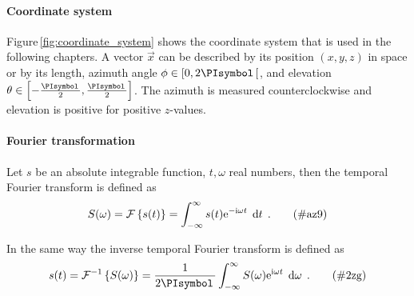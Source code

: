 \paragraph{Coordinate system}
Figure\,\ref{fig:coordinate_system} shows the coordinate system that is used in
the following chapters. A vector $\vec{x}$ can be described by its position
$(x,y,z)$ in space or by its length, azimuth angle $\phi \in [0,2\PI[$,
and elevation $\theta \in \left[-\frac{\PI}{2},\frac{\PI}{2}\right]$.
The azimuth is measured counterclockwise and elevation is positive
for positive $z$-values.


\paragraph{Fourier transformation}
Let $s$ be an absolute integrable function, $t,\omega$ real numbers, then the
temporal Fourier transform is defined as\autocite{Bracewell2000}
%
\begin{equation}
    S(\omega) = \FT{s(t)} = \int^{\infty}_{-\infty} s(t) \E^{-\I\omega t}
    \; \D{t}
    \qp
    \tag{\#az9}
    \label{eq:ft}
\end{equation}

In the same way the inverse temporal Fourier transform is defined as
%
\begin{equation}
    s(t) = \IFT{S(\omega)} = \frac{1}{2\PI} \int^{\infty}_{-\infty} S(\omega)
    \E^{\I\omega t} \; \D\omega
    \qp
    \tag{\#2zg}
    \label{eq:ift}
\end{equation}
